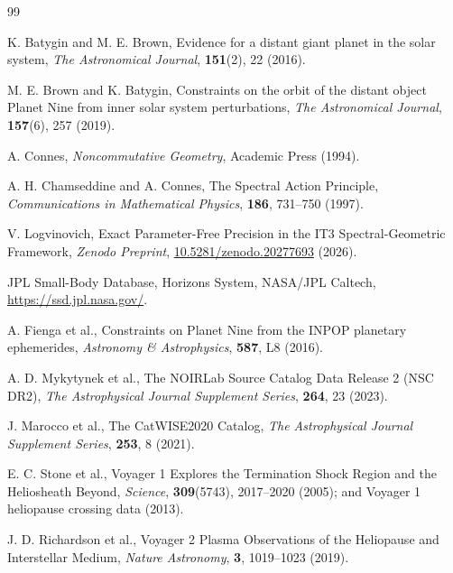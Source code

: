 \documentclass[11pt,a4paper]{article}
\theoremstyle{remark}
\begin{document}
\begin{thebibliography}{99}

K. Batygin and M. E. Brown,
\newblock Evidence for a distant giant planet in the solar system,
\newblock \emph{The Astronomical Journal}, \textbf{151}(2), 22 (2016).

M. E. Brown and K. Batygin,
\newblock Constraints on the orbit of the distant object Planet Nine from inner solar system perturbations,
\newblock \emph{The Astronomical Journal}, \textbf{157}(6), 257 (2019).

A. Connes,
\newblock \emph{Noncommutative Geometry},
\newblock Academic Press (1994).

A. H. Chamseddine and A. Connes,
\newblock The Spectral Action Principle,
\newblock \emph{Communications in Mathematical Physics}, \textbf{186}, 731--750 (1997).

V. Logvinovich,
\newblock Exact Parameter-Free Precision in the IT3 Spectral-Geometric Framework,
\newblock \emph{Zenodo Preprint}, \href{https://doi.org/10.5281/zenodo.20277693}{10.5281/zenodo.20277693} (2026).

JPL Small-Body Database,
\newblock Horizons System, NASA/JPL Caltech,
\newblock \url{https://ssd.jpl.nasa.gov/}.

A. Fienga et al.,
\newblock Constraints on Planet Nine from the INPOP planetary ephemerides,
\newblock \emph{Astronomy \& Astrophysics}, \textbf{587}, L8 (2016).

A. D. Mykytynek et al.,
\newblock The NOIRLab Source Catalog Data Release 2 (NSC DR2),
\newblock \emph{The Astrophysical Journal Supplement Series}, \textbf{264}, 23 (2023).

J. Marocco et al.,
\newblock The CatWISE2020 Catalog,
\newblock \emph{The Astrophysical Journal Supplement Series}, \textbf{253}, 8 (2021).

E. C. Stone et al.,
\newblock Voyager 1 Explores the Termination Shock Region and the Heliosheath Beyond,
\newblock \emph{Science}, \textbf{309}(5743), 2017--2020 (2005); and Voyager 1 heliopause crossing data (2013).

J. D. Richardson et al.,
\newblock Voyager 2 Plasma Observations of the Heliopause and Interstellar Medium,
\newblock \emph{Nature Astronomy}, \textbf{3}, 1019--1023 (2019).

\end{thebibliography}
\end{document}
